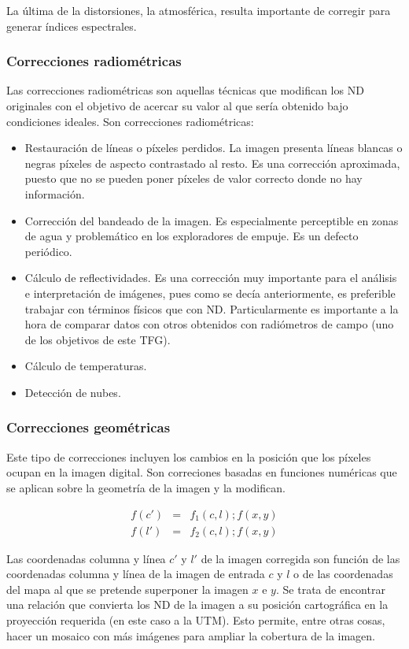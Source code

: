 La última de la distorsiones, la atmosférica, resulta importante de corregir para generar índices espectrales.%

\subsubsection{Correcciones radiométricas}
Las correcciones radiométricas son aquellas técnicas que modifican los \ac{ND} originales con el objetivo de acercar su valor al que sería obtenido bajo condiciones ideales. Son correcciones radiométricas:
\begin{itemize}
	\item Restauración de líneas o píxeles perdidos. La imagen presenta líneas blancas o negras píxeles de aspecto contrastado al resto. Es una corrección aproximada, puesto que no se pueden poner píxeles de valor correcto donde no hay información.
	\item Corrección del bandeado de la imagen. Es especialmente perceptible en zonas de agua y problemático en los exploradores de empuje. Es un defecto periódico.
	\item Cálculo de reflectividades. Es una corrección muy importante para el análisis e interpretación de imágenes, pues como se decía anteriormente, es preferible trabajar con términos físicos que con \ac{ND}. Particularmente es importante a la hora de comparar datos con otros obtenidos con radiómetros de campo (uno de los objetivos de este \ac{TFG}).
	\item Cálculo de temperaturas.
	\item Detección de nubes.
\end{itemize}

\subsubsection{Correcciones geométricas}
Este tipo de correcciones incluyen los cambios en la posición que los píxeles ocupan en la imagen digital. Son correciones basadas en funciones numéricas que se aplican sobre la geometría de la imagen y la modifican.%

\begin{eqnarray}
	f(c') & = & f_{1}(c,l) ; f(x,y) \\
	f(l') & = & f_{2}(c,l) ; f(x,y)
	\label{eq:correcgeom}
\end{eqnarray}%

Las coordenadas columna y línea $c'$ y $l'$ de la imagen corregida son función de las coordenadas columna y línea de la imagen de entrada $c$ y $l$ o de las coordenadas del mapa al que se pretende superponer la imagen $x$ e $y$. Se trata de encontrar una relación que convierta los \ac{ND} de la imagen a su posición cartográfica en la proyección requerida (en este caso a la \ac{UTM}). Esto permite, entre otras cosas, hacer un mosaico con más imágenes para ampliar la cobertura de la imagen.%

